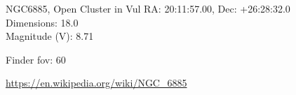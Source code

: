 \begin{block}{NGC6885, Open Cluster in Vul}
    RA: 20:11:57.00, Dec: +26:28:32.0 \\ 
    Dimensions: 18.0 \\ 
    Magnitude (V): 8.71


    Finder fov: 60 

    \url{https://en.wikipedia.org/wiki/NGC_6885}
\end{block}
